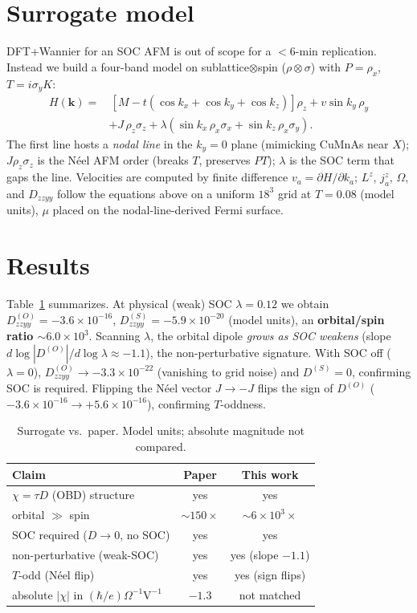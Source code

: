 \documentclass[aps,prl,twocolumn,superscriptaddress,floatfix]{revtex4-2}
\begin{document}
\section{Surrogate model}
DFT+Wannier for an SOC AFM is out of scope for a $<\!6$-min replication. Instead we
build a four-band model on sublattice$\otimes$spin ($\rho\otimes\sigma$) with
$P=\rho_x$, $T=i\sigma_y K$:
\begin{align}
H(\bm k)=&\,[M-t(\cos k_x+\cos k_y+\cos k_z)]\rho_z + v\sin k_y\,\rho_y\nonumber\\
&+ J\,\rho_z\sigma_z + \lambda(\sin k_x\,\rho_x\sigma_x+\sin k_z\,\rho_x\sigma_y).
\end{align}
The first line hosts a \emph{nodal line} in the $k_y=0$ plane (mimicking CuMnAs
near $X$); $J\rho_z\sigma_z$ is the N\'eel AFM order (breaks $T$, preserves $PT$);
$\lambda$ is the SOC term that gaps the line. Velocities are computed by finite
difference $v_a=\partial H/\partial k_a$; $L^z$, $j^z_a$, $\Omega$, and $D_{zzyy}$
follow the equations above on a uniform $18^3$ grid at $T=0.08$ (model units),
$\mu$ placed on the nodal-line-derived Fermi surface.

\section{Results}
Table~\ref{tab:res} summarizes. At physical (weak) SOC $\lambda=0.12$ we obtain
$D^{(O)}_{zzyy}=-3.6\times10^{-16}$, $D^{(S)}_{zzyy}=-5.9\times10^{-20}$
(model units), an \textbf{orbital/spin ratio $\sim6.0\times10^3$}. Scanning
$\lambda$, the orbital dipole \emph{grows as SOC weakens}
(slope $d\log|D^{(O)}|/d\log\lambda\approx-1.1$), the non-perturbative signature.
With SOC off ($\lambda=0$), $D^{(O)}_{zzyy}\to-3.3\times10^{-22}$ (vanishing to
grid noise) and $D^{(S)}=0$, confirming SOC is required. Flipping the N\'eel
vector $J\to-J$ flips the sign of $D^{(O)}$ ($-3.6\times10^{-16}\to
+5.6\times10^{-16}$), confirming $T$-oddness.

\begin{table}[t]
\caption{Surrogate vs.\ paper. Model units; absolute magnitude not compared.}
\label{tab:res}
\begin{ruledtabular}
\begin{tabular}{lcc}
Claim & Paper & This work \\ \hline
$\chi=\tau D$ (OBD) structure & yes & yes \\
orbital $\gg$ spin & $\sim\!150\times$ & $\sim\!6\times10^3\times$ \\
SOC required ($D\to0$, no SOC) & yes & yes \\
non-perturbative (weak-SOC) & yes & yes (slope $-1.1$) \\
$T$-odd (N\'eel flip) & yes & yes (sign flips) \\
absolute $|\chi|$ in $(\hbar/e)\Omega^{-1}\mathrm V^{-1}$ & $-1.3$ & not matched \\
\end{tabular}
\end{ruledtabular}
\end{table}
\end{document}
